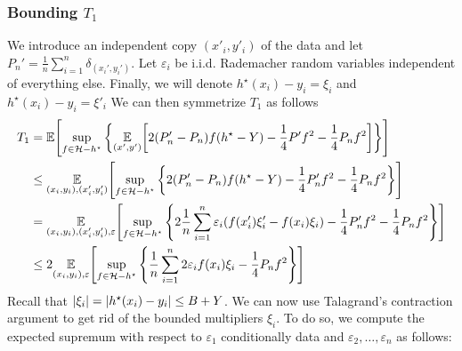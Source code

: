 \documentclass[main.tex]{subfiles}
\begin{document}
\subsubsection{Bounding \texorpdfstring{$T_{1}$}{T1}}
We introduce an independent copy $(x'_{i}, y'_{i})$ of the data
and let $P_{n}' = \frac{1}{n}\sum_{i=1}^{n}\delta_{(x_{i}', y_{i}')}$.
Let $\varepsilon_{i}$ be i.i.d. Rademacher random variables independent of
everything else.
Finally, we will denote
$h^{\star}(x_{i}) - y_{i} = \xi_{i}$
and
$h^{\star}(x_{i}) - y_{i} = \xi'_{i}$
We can then symmetrize $T_{1}$ as follows
\begin{align*}
  T_{1}
  &=
  \mathbb{E}\!\left[{
    \sup_{f \in \mathcal{H} - h^{\star}}
    \left\{
    \underset{{(x',y')}}{\mathbb{E}}\!\left[{
      2(P'_{n}-P_{n})f(h^{\star} - Y) - \frac{1}{4}P'f^{2} -
      \frac{1}{4}P_{n}f^{2}}\right]
    \right\}
   }\right] \\
 &\leq
  \underset{{(x_{i}, y_{i}), (x'_{i}, y'_{i})}}{\mathbb{E}}\!\left[{
    \sup_{f \in \mathcal{H} - h^{\star}}
    \left\{
      2(P'_{n}-P_{n})f(h^{\star} - Y) - \frac{1}{4}P_{n}'f^{2} -
      \frac{1}{4}P_{n}f^{2}
    \right\}
   }\right] \\
 &=
  \underset{{(x_{i}, y_{i}), (x'_{i}, y'_{i}), \varepsilon}}{\mathbb{E}}\!\left[{
    \sup_{f \in \mathcal{H} - h^{\star}}
    \left\{
      2\frac{1}{n}\sum_{i=1}^{n}
        \varepsilon_{i}(
          f(x'_{i})\xi_{i}'
          - f(x_{i})\xi_{i}
          )
      - \frac{1}{4}P_{n}'f^{2} -
        \frac{1}{4}P_{n}f^{2}
    \right\}
   }\right] \\
 &\leq
  2 \underset{{(x_{i}, y_{i}), \varepsilon}}{\mathbb{E}}\!\left[{
    \sup_{f \in \mathcal{H} - h^{\star}}
    \left\{
      \frac{1}{n}\sum_{i=1}^{n}
        2\varepsilon_{i}f(x_{i})\xi_{i}
        - \frac{1}{4}P_{n}f^{2}
    \right\}
   }\right] \\
\end{align*}
Recall that $\lvert \xi_{i} \rvert = \lvert h^{\star}(x_{i}) - y_{i} \rvert \leq B
+ Y$.
We can now use Talagrand's contraction argument to get rid of the
bounded multipliers $\xi_{i}$.
To do so, we compute the expected supremum with respect to $\varepsilon_{1}$
conditionally data and $\varepsilon_{2}, \dots, \varepsilon_{n}$ as follows:
\end{document}
